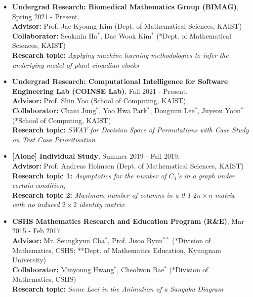 \documentclass[10pt,a4]{article}
\begin{document}
\begin{small}
\begin{itemize}
 \item {\bf Undergrad Research: Biomedical Mathematics Group (BIMAG)}, Spring 2021 - Present. \\
{\bf Advisor:} Prof. Jae Kyoung Kim (Dept. of Mathematical Sciences, KAIST) \\
{\bf Collaborator:} Seokmin Ha$^{*}$, Dae Wook Kim$^{*}$ (*Dept. of Mathematical Sciences, KAIST) \\
{\bf Research topic:} {\it Applying machine learning methodologies to infer the underlying model of plant circadian clocks} \\

 \item {\bf Undergrad Research: Computational Intelligence for Software Engineering Lab (COINSE Lab)}, Fall 2021 - Present. \\
{\bf Advisor:} Prof. Shin Yoo (School of Computing, KAIST) \\
 {\bf Collaborator:} Chani Jung$^{*}$, Yoo Hwa Park$^{*}$, Dongmin Lee$^{*}$, Juyeon Yoon$^{*}$ (*School of Computing, KAIST) \\
{\bf Research topic:} {\it SWAY for Decision Space of Permutations with Case Study on Test Case Prioritisation } \\

 \item {\bf [Alone] Individual Study}, Summer 2019 - Fall 2019. \\
 {\bf Advisor:} Prof. Andreas Holmsen (Dept. of Mathematical Sciences, KAIST) \\
 {\bf Research topic 1:} {\it Asymptotics for the number of $C_4$'s in a graph under certain condition}, \\
 {\bf Research topic 2:} {\it Maximum number of columns in a 0-1 $2n \times n$ matrix with no induced $2 \times 2$ identity matrix} \\

\item {\bf CSHS Mathematics Research and Education Program (R\&E)}, Mar 2015 - Feb 2017. \\
 {\bf Advisor:} Mr. Seungkyun Cha$^{*}$, Prof. Jisoo Byun$^{**}$ (*Division of Mathematics, CSHS; **Dept. of Mathematics Education, Kyungnam University) \\
 {\bf Collaborator:} Minyoung Hwang$^{*}$, Cheolwon Bae$^{*}$ (*Division of Mathematics, CSHS) \\
 {\bf Research topic:} {\it Some Loci in the Animation of a Sangaku Diagram} \\
 

\end{itemize}
\end{small}
\end{document}
